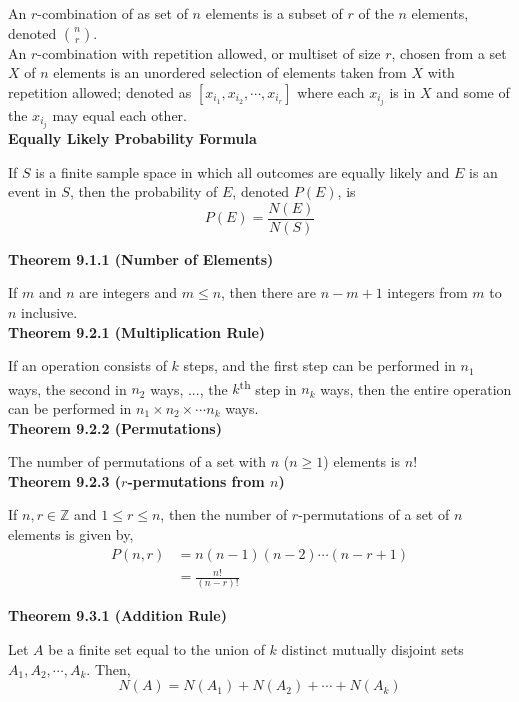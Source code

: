 \documentclass[a4paper]{article}
\newcommand{\subheading}[1]{{\scriptsize\textbf{#1}}}
\begin{document}
\begin{multicols*}{4}
An $r$-combination of as set of $n$ elements is a subset of $r$ of the $n$
elements, denoted $\binom{n}{r}$.\\

An $r$-combination with repetition allowed, or multiset of size $r$, chosen from
a set $X$ of $n$ elements is an unordered selection of elements taken from $X$
with repetition allowed; denoted as $[x_{i_1}, x_{i_2}, \cdots, x_{i_r}]$ where
each $x_{i_j}$ is in $X$ and some of the $x_{i_j}$ may equal each other.\\

\subheading{Equally Likely Probability Formula}

If $S$ is a finite sample space in which all outcomes are equally likely and $E$
is an event in $S$, then the probability of $E$, denoted $P(E)$, is
$$P(E) = \frac{N(E)}{N(S)}$$

\subheading{Theorem 9.1.1 (Number of Elements)}

If $m$ and $n$ are integers and $m \leq n$, then there are $n-m+1$ integers from
$m$ to $n$ inclusive.\\

\subheading{Theorem 9.2.1 (Multiplication Rule)}

If an operation consists of $k$ steps, and the first step can be performed in
$n_1$ ways, the second in $n_2$ ways, ..., the $k$\textsuperscript{th} step
in $n_k$ ways, then the entire operation can be performed in $n_1 \times n_2
\times \cdots n_k$ ways.\\

\subheading{Theorem 9.2.2 (Permutations)}

The number of permutations of a set with $n$ ($n \geq 1$) elements is $n!$\\

\subheading{Theorem 9.2.3 ($r$-permutations from $n$)}

If $n, r \in \mathbb{Z}$ and $1 \leq r \leq n$, then the number of
$r$-permutations of a set of $n$ elements is given by,
\begin{align*}
  P(n, r) &= n(n-1)(n-2)\cdots(n-r+1) \\
          &= \frac{n!}{(n-r)!}
\end{align*}

\subheading{Theorem 9.3.1 (Addition Rule)}

Let $A$ be a finite set equal to the union of $k$ distinct mutually disjoint
sets $A_1, A_2, \cdots, A_k$. Then, $$N(A) = N(A_1) + N(A_2) + \cdots + N(A_k)$$


\end{multicols*}
\end{document}
